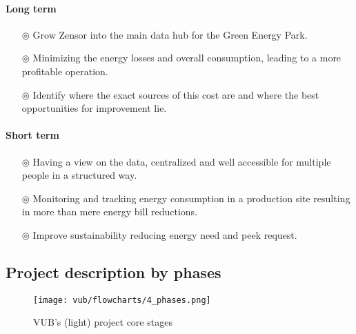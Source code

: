 \paragraph{Long term}
\begin{itemize}
    \item[$\circledcirc$] Grow Zensor into the main data hub for the Green Energy Park.
    \item[$\circledcirc$] Minimizing the energy losses and overall consumption, leading to a more profitable operation.
    \item[$\circledcirc$] Identify where the exact sources of this cost are and where the best opportunities for improvement lie.
\end{itemize}
\paragraph{Short term}
\begin{itemize}
    \item[$\circledcirc$] Having a view on the data, centralized and well accessible for multiple people in a structured way.
    \item[$\circledcirc$] Monitoring and tracking energy consumption in a production site resulting in more than mere energy bill reductions.
    \item[$\circledcirc$] Improve sustainability reducing energy need and peek request. 
\end{itemize}

\subsection{Project description by phases}
\begin{figure}[ht]
    \texttt{[image: vub/flowcharts/4\_phases.png]}
    \caption{\ac{VUB}'s (light) project core stages}
    \label{fig:vub_stages}
\end{figure}


